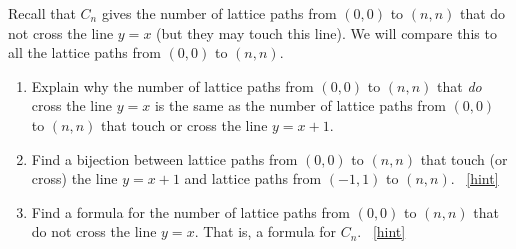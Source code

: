 \documentclass{book}
\begin{document}
\setcounter{project}{182}
\addtocounter{project}{-1}
\begin{activity}[]\label{activity-175}
\hypertarget{p-1067}{}%
Recall that \(C_n\) gives the number of lattice paths from \((0,0)\) to \((n,n)\) that do not cross the line \(y = x\) (but they may touch this line).  We will compare this to all the lattice paths from \((0,0)\) to \((n,n)\).%
\begin{enumerate}[font=\bfseries,label=(\alph*),ref=\alph*]
\item\label{task-195} \hypertarget{p-1068}{}%
Explain why the number of lattice paths from \((0,0)\) to \((n,n)\) that \emph{do} cross the line \(y = x\) is the same as the number of lattice paths from \((0,0)\) to \((n,n)\) that touch or cross the line \(y = x + 1\).%
\item\label{task-196} \hypertarget{p-1070}{}%
Find a bijection between lattice paths from \((0,0)\) to \((n,n)\) that touch (or cross) the line \(y=x+1\) and lattice paths from \((-1,1)\) to \((n,n)\).%
~\hfill{\tiny\hyperlink{a-182.b}{[hint]}\hypertarget{q-182.b}{}}\item\label{task-197} \hypertarget{p-1073}{}%
Find a formula for the number of lattice paths from \((0,0)\) to \((n,n)\) that do not cross the line \(y=x\). That is, a formula for \(C_n\).%
~\hfill{\tiny\hyperlink{a-182.c}{[hint]}\hypertarget{q-182.c}{}}\end{enumerate}
\end{activity}
\end{document}
